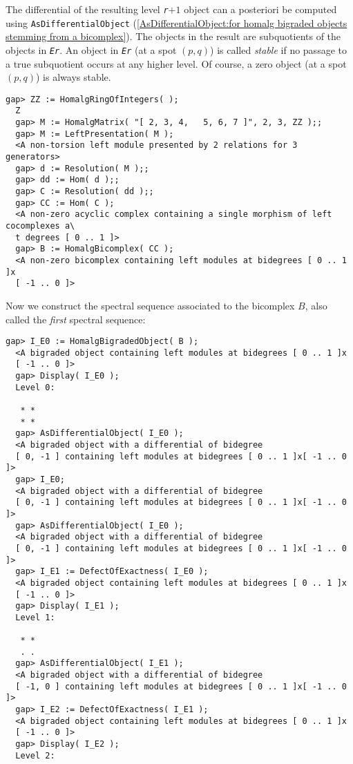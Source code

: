 \documentclass[a4paper,11pt]{report}
\begin{document}
{{{ The differential of the resulting level \mbox{\texttt{\slshape r}}$+1$ object can a posteriori be computed using \texttt{AsDifferentialObject} (\ref{AsDifferentialObject:for homalg bigraded objects stemming from a bicomplex}). The objects in the result are subquotients of the objects in \mbox{\texttt{\slshape Er}}. An object in \mbox{\texttt{\slshape Er}} (at a spot $(p,q)$) is called \emph{stable} if no passage to a true subquotient occurs at any higher level. Of course, a
zero object (at a spot $(p,q)$) is always stable. 
\begin{Verbatim}[fontsize=\small,frame=single,label=Example]
  gap> ZZ := HomalgRingOfIntegers( );
  Z
  gap> M := HomalgMatrix( "[ 2, 3, 4,   5, 6, 7 ]", 2, 3, ZZ );;
  gap> M := LeftPresentation( M );
  <A non-torsion left module presented by 2 relations for 3 generators>
  gap> d := Resolution( M );;
  gap> dd := Hom( d );;
  gap> C := Resolution( dd );;
  gap> CC := Hom( C );
  <A non-zero acyclic complex containing a single morphism of left cocomplexes a\
  t degrees [ 0 .. 1 ]>
  gap> B := HomalgBicomplex( CC );
  <A non-zero bicomplex containing left modules at bidegrees [ 0 .. 1 ]x
  [ -1 .. 0 ]>
\end{Verbatim}
 Now we construct the spectral sequence associated to the bicomplex $B$, also called the \emph{first} spectral sequence: 
\begin{Verbatim}[fontsize=\small,frame=single,label=Example]
  gap> I_E0 := HomalgBigradedObject( B );
  <A bigraded object containing left modules at bidegrees [ 0 .. 1 ]x
  [ -1 .. 0 ]>
  gap> Display( I_E0 );
  Level 0:
  
   * *
   * *
  gap> AsDifferentialObject( I_E0 );
  <A bigraded object with a differential of bidegree
  [ 0, -1 ] containing left modules at bidegrees [ 0 .. 1 ]x[ -1 .. 0 ]>
  gap> I_E0;
  <A bigraded object with a differential of bidegree
  [ 0, -1 ] containing left modules at bidegrees [ 0 .. 1 ]x[ -1 .. 0 ]>
  gap> AsDifferentialObject( I_E0 );
  <A bigraded object with a differential of bidegree
  [ 0, -1 ] containing left modules at bidegrees [ 0 .. 1 ]x[ -1 .. 0 ]>
  gap> I_E1 := DefectOfExactness( I_E0 );
  <A bigraded object containing left modules at bidegrees [ 0 .. 1 ]x
  [ -1 .. 0 ]>
  gap> Display( I_E1 );
  Level 1:
  
   * *
   . .
  gap> AsDifferentialObject( I_E1 );
  <A bigraded object with a differential of bidegree
  [ -1, 0 ] containing left modules at bidegrees [ 0 .. 1 ]x[ -1 .. 0 ]>
  gap> I_E2 := DefectOfExactness( I_E1 );
  <A bigraded object containing left modules at bidegrees [ 0 .. 1 ]x
  [ -1 .. 0 ]>
  gap> Display( I_E2 );
  Level 2:
  

\end{Verbatim}}}}
\end{document}
